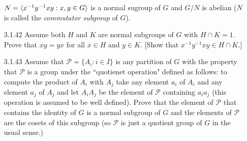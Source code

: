 \begin{enumerate}
                  $N = \langle x^{-1}y^{-1}xy : x, y \in G \rangle$ is a normal sugroup of
                  $G$ and $G/N$ is abelian ($N$ is called the
                  \textit{commutator subgroup} of $G$).
   \item[3.1.42]  Assume both $H$ and $K$ are normal subgroups of $G$ with
                  $H \cap K = 1$. Prove that $xy = yx$ for all $x \in H$ and
                  $y \in K$. [Show that $x^{-1}y^{-1}xy \in H \cap K$.]
   \item[3.1.43]  Assume that $\mathcal{P} = \{A_i : i \in I\}$ is any partition
                  of $G$ with the property that $\mathcal{P}$ is a group under
                  the ``quotienet operation" defined as follows: to compute the
                  product of $A_i$ with $A_j$ take any element $a_i$ of $A_i$
                  and any element $a_j$ of $A_j$ and let $A_iA_j$ be the element
                  of $\mathcal{P}$ containing $a_ia_j$ (this operation is
                  assumed to be well defined). Prove that the element of
                  $\mathcal{P}$ that contains the identity of $G$ is a normal
                  subgroup of $G$ and the elements of $\mathcal{P}$ are the
                  cosets of this subgroup (so $\mathcal{P}$ is just a quotient
                  group of $G$ in the usual sense.)
\end{enumerate}
